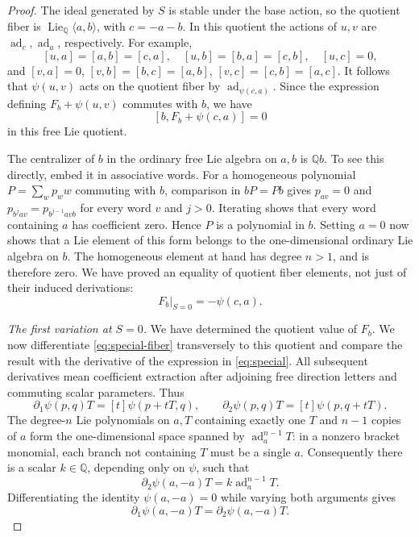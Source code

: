 \documentclass[11pt]{article}
\newcommand{\Q}{\mathbb Q}
\newcommand{\Lie}{\operatorname{Lie}}
\DeclareMathOperator{\ad}{ad}
\theoremstyle{definition}
\theoremstyle{remark}
\numberwithin{equation}{section}
\begin{document}
\begin{proof}
The ideal generated by \(S\) is stable under the base action, so the
quotient fiber is \(\Lie_{\Q}\langle a,b\rangle\), with
\(c=-a-b\).  In this quotient the actions of \(u,v\) are
\(\ad_c,\ad_a\), respectively.  For example,
\[
 [u,a]=[a,b]=[c,a],\quad [u,b]=[b,a]=[c,b],\quad [u,c]=0,
\]
and
\([v,a]=0\), \([v,b]=[b,c]=[a,b]\),
\([v,c]=[c,b]=[a,c]\).  It follows that \(\psi(u,v)\) acts on
the quotient fiber by \(\ad_{\psi(c,a)}\).  Since the expression
defining \(F_b+\psi(u,v)\) commutes with \(b\), we have
\[
 [b,F_b+\psi(c,a)]=0
\]
in this free Lie quotient.

The centralizer of \(b\) in the ordinary free Lie algebra on \(a,b\)
is \(\Q b\).  To see this directly, embed it in associative words.
For a homogeneous polynomial \(P=\sum_w p_w w\) commuting with
\(b\), comparison in \(bP=Pb\) gives
\(p_{av}=0\) and
\(p_{b^j av}=p_{b^{j-1}avb}\) for every word \(v\) and \(j>0\).
Iterating shows that every word containing \(a\) has coefficient
zero.  Hence \(P\) is a polynomial in \(b\).  Setting \(a=0\) now shows that a
Lie element of this form belongs to the one-dimensional ordinary
Lie algebra on \(b\).  The homogeneous element at hand has degree
\(n>1\), and is therefore zero.  We have proved an equality of
quotient fiber elements, not just of their induced derivations:
\begin{equation}\label{eq:special-fb}
 F_b\big|_{S=0}=-\psi(c,a).
\end{equation}

\emph{The first variation at \(S=0\).}
We have determined the quotient value of \(F_b\).  We now differentiate
\eqref{eq:special-fiber} transversely to this quotient and compare the
result with the derivative of the expression in \eqref{eq:special}.
All subsequent derivatives mean coefficient
extraction after adjoining free direction letters and commuting
scalar parameters.  Thus
\[
 \partial_1\psi(p,q)T=[t]\psi(p+tT,q),\qquad
 \partial_2\psi(p,q)T=[t]\psi(p,q+tT).
\]
The degree-\(n\) Lie polynomials on \(a,T\) containing exactly one
\(T\) and \(n-1\) copies of \(a\) form the one-dimensional space
spanned by \(\ad_a^{n-1}T\): in a nonzero bracket monomial, each
branch not containing \(T\) must be a single \(a\).  Consequently
there is a scalar \(k\in\Q\), depending only on \(\psi\), such that
\begin{equation}\label{eq:special-k}
 \partial_2\psi(a,-a)T=k\ad_a^{n-1}T.
\end{equation}
Differentiating the identity \(\psi(a,-a)=0\) while varying both
arguments gives
\begin{equation}\label{eq:special-diagonal}
 \partial_1\psi(a,-a)T=\partial_2\psi(a,-a)T.
\end{equation}


\end{proof}
\end{document}
